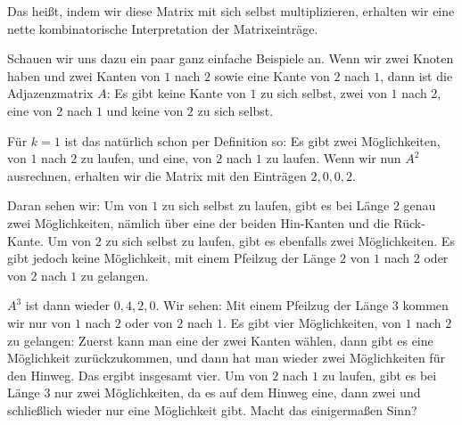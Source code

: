 \begin{spoken-clean}[01:17:18 - 01:21:54]
Das heißt, indem wir diese Matrix mit sich selbst multiplizieren, erhalten wir eine nette kombinatorische Interpretation der Matrixeinträge.

Schauen wir uns dazu ein paar ganz einfache Beispiele an. Wenn wir zwei Knoten haben und zwei Kanten von $1$ nach $2$ sowie eine Kante von $2$ nach $1$, dann ist die Adjazenzmatrix $A$: Es gibt keine Kante von $1$ zu sich selbst, zwei von $1$ nach $2$, eine von $2$ nach $1$ und keine von $2$ zu sich selbst.

Für $k=1$ ist das natürlich schon per Definition so: Es gibt zwei Möglichkeiten, von $1$ nach $2$ zu laufen, und eine, von $2$ nach $1$ zu laufen. Wenn wir nun $A^2$ ausrechnen, erhalten wir die Matrix mit den Einträgen $2, 0, 0, 2$.

Daran sehen wir: Um von $1$ zu sich selbst zu laufen, gibt es bei Länge $2$ genau zwei Möglichkeiten, nämlich über eine der beiden Hin-Kanten und die Rück-Kante. Um von $2$ zu sich selbst zu laufen, gibt es ebenfalls zwei Möglichkeiten. Es gibt jedoch keine Möglichkeit, mit einem Pfeilzug der Länge $2$ von $1$ nach $2$ oder von $2$ nach $1$ zu gelangen.

$A^3$ ist dann wieder $0, 4, 2, 0$. Wir sehen: Mit einem Pfeilzug der Länge $3$ kommen wir nur von $1$ nach $2$ oder von $2$ nach $1$. Es gibt vier Möglichkeiten, von $1$ nach $2$ zu gelangen: Zuerst kann man eine der zwei Kanten wählen, dann gibt es eine Möglichkeit zurückzukommen, und dann hat man wieder zwei Möglichkeiten für den Hinweg. Das ergibt insgesamt vier. Um von $2$ nach $1$ zu laufen, gibt es bei Länge $3$ nur zwei Möglichkeiten, da es auf dem Hinweg eine, dann zwei und schließlich wieder nur eine Möglichkeit gibt. Macht das einigermaßen Sinn?
\end{spoken-clean}

